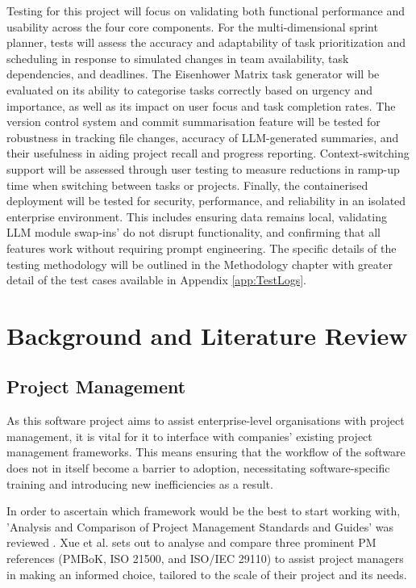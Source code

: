 \documentclass{report}
\begin{document}
Testing for this project will focus on validating both functional performance and usability across the four core components. For the multi-dimensional sprint planner, tests will assess the accuracy and adaptability of task prioritization and scheduling in response to simulated changes in team availability, task dependencies, and deadlines. The Eisenhower Matrix task generator will be evaluated on its ability to categorise tasks correctly based on urgency and importance, as well as its impact on user focus and task completion rates.
The version control system and commit summarisation feature will be tested for robustness in tracking file changes, accuracy of LLM-generated summaries, and their usefulness in aiding project recall and progress reporting. Context-switching support will be assessed through user testing to measure reductions in ramp-up time when switching between tasks or projects.
Finally, the containerised deployment will be tested for security, performance, and reliability in an isolated enterprise environment. This includes ensuring data remains local, validating LLM module swap-ins' do not disrupt functionality, and confirming that all features work without requiring prompt engineering. The specific details of the testing methodology will be outlined in the Methodology chapter with greater detail of the test cases available in Appendix \ref{app:TestLogs}.

\chapter{Background and Literature Review}  %
\section{Project Management}

As this software project aims to assist enterprise-level organisations with project management, it is vital for it to interface with companies' existing project management frameworks. This means ensuring that the workflow of the software does not in itself become a barrier to adoption, necessitating software-specific training and introducing new inefficiencies as a result.

In order to ascertain which framework would be the best to start working with, 'Analysis and Comparison of Project Management Standards and Guides' was reviewed \parencite{xueAnalysisComparisonProject}. Xue et al. sets out to analyse and compare three prominent PM references (PMBoK, ISO 21500, and ISO/IEC 29110) to assist project managers in making an informed choice, tailored to the scale of their project and its needs.
\end{document}
